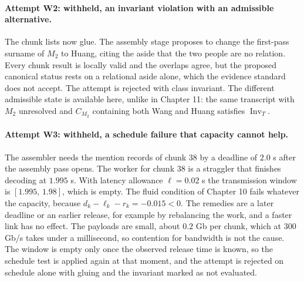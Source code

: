 \documentclass[11pt,openany]{book}
\theoremstyle{remark}
\begin{document}
\paragraph{Attempt W2: withheld, an invariant violation with an admissible alternative.} The chunk lists now glue. The assembly stage proposes to change the first-pass surname of $M_2$ to Huang, citing the aside that the two people are no relation. Every chunk result is locally valid and the overlaps agree, but the proposed canonical status rests on a relational aside alone, which the evidence standard does not accept. The attempt is rejected with class invariant. The different admissible state is available here, unlike in Chapter 11: the same transcript with $M_2$ unresolved and $C_{M_2}$ containing both Wang and Huang satisfies $\operatorname{Inv}_T$.

\paragraph{Attempt W3: withheld, a schedule failure that capacity cannot help.} The assembler needs the mention records of chunk $38$ by a deadline of $2.0$ s after the assembly pass opens. The worker for chunk $38$ is a straggler that finishes decoding at $1.995$ s. With latency allowance $\ell=0.02$ s the transmission window is $[1.995,\,1.98]$, which is empty. The fluid condition of Chapter 10 fails whatever the capacity, because $d_k-\ell_k-r_k=-0.015<0$. The remedies are a later deadline or an earlier release, for example by rebalancing the work, and a faster link has no effect. The payloads are small, about $0.2$ Gb per chunk, which at $300$ Gb/s takes under a millisecond, so contention for bandwidth is not the cause. The window is empty only once the observed release time is known, so the schedule test is applied again at that moment, and the attempt is rejected on schedule alone with gluing and the invariant marked as not evaluated.
\end{document}
